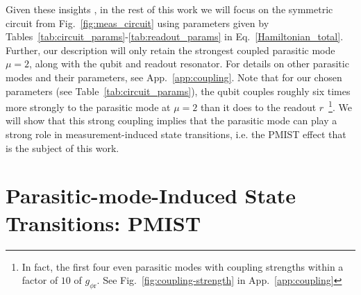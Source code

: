 \documentclass[%
reprint,
superscriptaddress,
 amsmath,amssymb,
 aps,
 prx,
longbibliography,
floatfix,
]{revtex4-2}
\begin{document}
 Given these insights%
 , in the rest of this work we will focus on the symmetric circuit from Fig.~\ref{fig:meas_circuit} using parameters given by Tables~\ref{tab:circuit_params}-\ref{tab:readout_params} in Eq.~\ref{Hamiltonian_total}.  Further, our description will only retain the strongest coupled parasitic mode $\mu = 2$, along with the qubit and readout resonator.  For details on other parasitic modes and their parameters, see App.~\ref{app:coupling}. Note that for our chosen parameters (see Table~\ref{tab:circuit_params}), the qubit couples roughly six times more strongly to the parasitic mode at $\mu=2$ than it does to the readout $r$~\footnote{In fact, the first four even parasitic modes with coupling strengths within a factor of $10$ of $g_{\phi \textrm{r}}$. See Fig.~\ref{fig:coupling-strength} in App.~\ref{app:coupling}}.  We will show that this strong coupling implies that the parasitic mode can play a strong role in measurement-induced state transitions, i.e. the PMIST effect that is the subject of this work.   

\section{Parasitic-mode-Induced State Transitions: PMIST}\label{sec:MIST}
\end{document}
